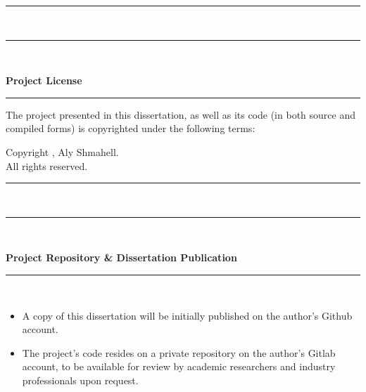 \documentclass[a4paper, 12pt]{report}
\newenvironment{nscenter}
{\parskip=0.2cm\par\nopagebreak\centering}
{\parskip=0pt\par\noindent\ignorespacesafterend}
\begin{document}
\begin{titlepage}
\begin{nscenter}
	\end{nscenter}	
	\rule{\linewidth}{0.2mm} \\[0.5cm]
	\noindent
	\rule{\linewidth}{0.5mm} \\[0.2cm]
	\begin{minipage}{0.5\textwidth}
		\Large{\textbf{Project License}}
	\end{minipage}
	\begin{minipage}{0.5\textwidth}
		\begin{flushright}
			\Huge{\textcopyright}
		\end{flushright}
	\end{minipage}
	\rule{\linewidth}{0.2mm}
	\noindent
	\vspace{-0.45cm}
	\begin{nscenter}
		The project presented in this dissertation, as well as its code (in both source and compiled forms) is copyrighted under the following terms:
	\end{nscenter}
	\vspace{-0.5cm}
	\begin{tcbraster}[raster columns=2,raster rows=1,
		enhanced,size=small,fit algorithm=hybrid* ]
		\begin{nscenter}
			\begin{tcolorbox}[colback=white]
				\begin{center}
					Copyright \textcopyright {}, Aly Shmahell.\\
					All rights reserved.
				\end{center}
			\end{tcolorbox}
		\end{nscenter}
	\end{tcbraster}
	\rule{\linewidth}{0.2mm} \\[0.5cm]
	\noindent
	\rule{\linewidth}{0.5mm} \\[0.2cm]
	\begin{minipage}{\textwidth}
		\Large{\textbf{Project Repository \& Dissertation Publication}}
	\end{minipage}
	\rule{\linewidth}{0.2mm} \\[0.1cm]
	\noindent
	\vspace{-0.6cm}
		\begin{itemize}[nosep]
		\item A copy of this dissertation will be initially published on the author's Github account.
		\item The project's code resides on a private repository on the author's Gitlab account, to be available for review by academic researchers and industry professionals upon request.

\end{itemize}
\end{titlepage}
\end{document}
